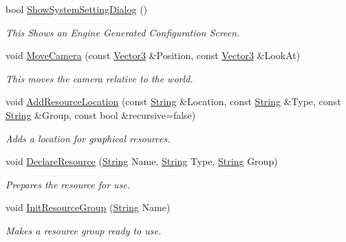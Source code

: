 \begin{DoxyCompactItemize}
bool \hyperlink{classphys_1_1World_a0d8ce136bebe81a6826b7e202a531f6a}{ShowSystemSettingDialog} ()
\begin{DoxyCompactList}\small\item\em This Shows an Engine Generated Configuration Screen. \item\end{DoxyCompactList}\item 
void \hyperlink{classphys_1_1World_aed87ebc1e559c3057132c50bba16117f}{MoveCamera} (const \hyperlink{classphys_1_1Vector3}{Vector3} \&Position, const \hyperlink{classphys_1_1Vector3}{Vector3} \&LookAt)
\begin{DoxyCompactList}\small\item\em This moves the camera relative to the world. \item\end{DoxyCompactList}\item 
void \hyperlink{classphys_1_1World_ab26033088abe4d60a40cf770dd1b0de8}{AddResourceLocation} (const \hyperlink{namespacephys_aa03900411993de7fbfec4789bc1d392e}{String} \&Location, const \hyperlink{namespacephys_aa03900411993de7fbfec4789bc1d392e}{String} \&Type, const \hyperlink{namespacephys_aa03900411993de7fbfec4789bc1d392e}{String} \&Group, const bool \&recursive=false)
\begin{DoxyCompactList}\small\item\em Adds a location for graphical resources. \item\end{DoxyCompactList}\item 
void \hyperlink{classphys_1_1World_ad8c9834c1b9a0de437a0b29f17c0c48e}{DeclareResource} (\hyperlink{namespacephys_aa03900411993de7fbfec4789bc1d392e}{String} Name, \hyperlink{namespacephys_aa03900411993de7fbfec4789bc1d392e}{String} Type, \hyperlink{namespacephys_aa03900411993de7fbfec4789bc1d392e}{String} Group)
\begin{DoxyCompactList}\small\item\em Prepares the resource for use. \item\end{DoxyCompactList}\item 
void \hyperlink{classphys_1_1World_a82b1b40f39c1f2e48759fdb77389153d}{InitResourceGroup} (\hyperlink{namespacephys_aa03900411993de7fbfec4789bc1d392e}{String} Name)
\begin{DoxyCompactList}\small\item\em Makes a resource group ready to use. \item\end{DoxyCompactList}\item 

\end{DoxyCompactItemize}
